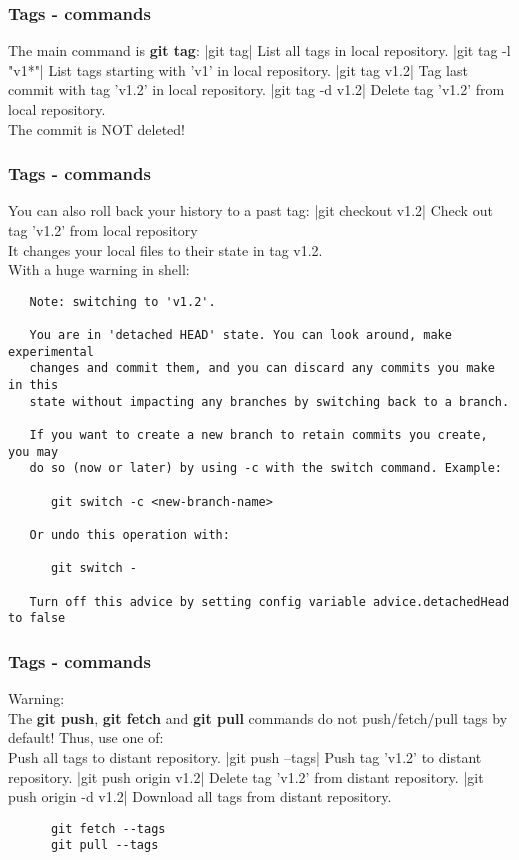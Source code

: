 \begin{frame}\frametitle{Tags - commands}
   \small
   The main command is {\bf git tag}:
   |git tag|
   List all tags in local repository.
   |git tag -l "v1*"|
   List tags starting with 'v1' in local repository.
   |git tag v1.2|
   Tag last commit with tag 'v1.2' in local repository.
   |git tag -d v1.2|
   Delete tag 'v1.2' from local repository. \\
   The commit is NOT deleted!
\end{frame}

\begin{frame}[fragile]
\frametitle{Tags - commands}
   You can also roll back your history to a past tag:
   |git checkout v1.2|
   Check out tag 'v1.2' from local repository \\
   It changes your local files to their state in tag v1.2. \\
   \alert{With a huge warning in shell:}
   \begin{verbatim}
   Note: switching to 'v1.2'.

   You are in 'detached HEAD' state. You can look around, make experimental
   changes and commit them, and you can discard any commits you make in this
   state without impacting any branches by switching back to a branch.

   If you want to create a new branch to retain commits you create, you may
   do so (now or later) by using -c with the switch command. Example:

      git switch -c <new-branch-name>

   Or undo this operation with:

      git switch -

   Turn off this advice by setting config variable advice.detachedHead to false
   \end{verbatim}
\end{frame}

\begin{frame}[fragile]
\frametitle{Tags - commands}
   \footnotesize
   \alert{Warning:} \\
   The {\bf git push}, {\bf git fetch} and {\bf git pull} commands do not push/fetch/pull tags by default! Thus, use one of:\\
   Push all tags to distant repository.
   |git push --tags|
   Push tag 'v1.2' to distant repository.
   |git push origin v1.2|
   Delete tag 'v1.2' from distant repository.
   |git push origin -d v1.2|
   Download all tags from distant repository.
   \begin{verbatim}
      git fetch --tags
      git pull --tags
   \end{verbatim}
\end{frame}


